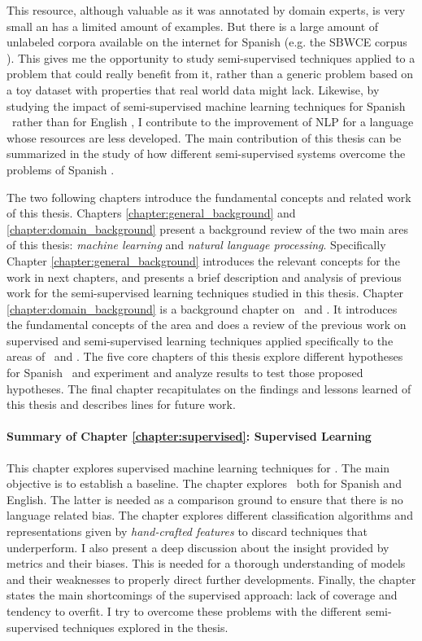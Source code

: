 This resource, although valuable as it was annotated by domain experts, is very
small an has a limited amount of examples. But there is a large amount of
unlabeled corpora available on the internet for Spanish (e.g. the SBWCE corpus
\cite{cardellinoSBWCE}). This gives me the opportunity to study semi-supervised
techniques applied to a problem that could really benefit from it, rather than
a generic problem based on a toy dataset with properties that real world data
might lack. Likewise, by studying the impact of semi-supervised machine
learning techniques for Spanish \vsd~rather than for English \vsd, I contribute
to the improvement of NLP for a language whose resources are less developed.
The main contribution of this thesis can be summarized in the study of how
different semi-supervised systems overcome the problems of Spanish \vsd.

The two following chapters introduce the fundamental concepts and related work
of this thesis. Chapters \ref{chapter:general_background} and
\ref{chapter:domain_background} present a background review of the two main
ares of this thesis: {\em machine learning} and {\em natural language
processing}. Specifically Chapter \ref{chapter:general_background} introduces
the relevant concepts for the work in next chapters, and presents a brief
description and analysis of previous work for the semi-supervised learning
techniques studied in this thesis. Chapter \ref{chapter:domain_background} is a
background chapter on \nlp~and \wsd. It introduces the fundamental concepts of
the area and does a review of the previous work on supervised and
semi-supervised learning techniques applied specifically to the areas of
\nlp~and \vsd. The five core chapters of this thesis explore different
hypotheses for Spanish \vsd~and experiment and analyze results to test those
proposed hypotheses.  The final chapter recapitulates on the findings and
lessons learned of this thesis and describes lines for future work.

\paragraph{Summary of Chapter \ref{chapter:supervised}: Supervised Learning}

This chapter explores supervised machine learning techniques for \vsd. The main
objective is to establish a baseline. The chapter explores \vsd~both for
Spanish and English. The latter is needed as a comparison ground to ensure that
there is no language related bias. The chapter explores different
classification algorithms and representations given by {\em hand-crafted
features} to discard techniques that underperform. I also present a deep
discussion about the insight provided by metrics and their biases.  This is
needed for a thorough understanding of models and their weaknesses to properly
direct further developments. Finally, the chapter states the main shortcomings
of the supervised approach: lack of coverage and tendency to overfit. I try to
overcome these problems with the different semi-supervised techniques explored
in the thesis.

